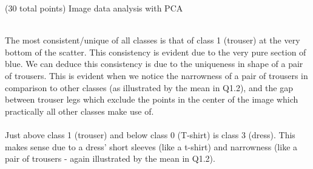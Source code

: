 \documentclass[12pt]{article}
\begin{document}
\begin{question}{(30 total points) Image data analysis with PCA}
\begin{subquestion}
\begin{answerbox}{52.5em}
{\\
        The most consistent/unique of all classes is that of class 1 (trouser) at the very bottom of the scatter. This consistency is evident due to the very pure section of blue. We can deduce this consistency is due to the uniqueness in shape of a pair of trousers. This is evident when we notice the narrowness of a pair of trousers in comparison to other classes (as illustrated by the mean in Q1.2), and the gap between trouser legs which exclude the points in the center of the image which practically all other classes make use of.\\
\\
        Just above class 1 (trouser) and below class 0 (T-shirt) is class 3 (dress). This makes sense due to a dress' short sleeves (like a t-shirt) and narrowness (like a pair of trousers - again illustrated by the mean in Q1.2).
        }
      \end{answerbox}
  


   \end{subquestion}
   

\end{question}
\clearpage
%
%
\end{document}
